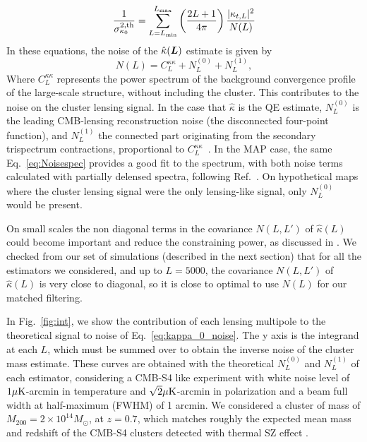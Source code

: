 \documentclass[prd, superscriptaddress, tightenlines, longbibliography, nofootinbib, eqsecnum, amsfonts, amsmath, floatfix, twocolumn, notitlepage]{revtex4-2}
\begin{document}
\begin{equation}
\frac{1}{\sigma^{2,\text{th}}_{\kappa_0}}=	\sum_{L=L_{\rm min}}^{L_{\rm max}} \left( \frac{2L + 1}{4\pi} \right)\frac{|\kappa_{t,L}|^2}{N(L)}
\end{equation}
In these equations, the noise of the $\hat \kappa(\vL)$ estimate is given by \begin{equation}\label{eq:Noisespec}
 	N(L) = C_L^{\kappa\kappa} + N_L^{(0)} + N_L^{(1)},
 \end{equation}
Where $C_L^{\kappa\kappa}$ represents the power spectrum of the background convergence profile of the large-scale structure, without including the cluster. This contributes to the noise on the cluster lensing signal. In the case that $\hat \kappa$ is the QE estimate, $N^{(0)}_L$ is the leading CMB-lensing reconstruction noise (the disconnected four-point function), and $N^{(1)}_L$ the connected part originating from the secondary trispectrum contractions, proportional to $C_L^{\kappa\kappa}$~\cite{Kesden:2003cc,Lewis:2006fu}. In the MAP case, the same Eq.~\eqref{eq:Noisespec} provides a good fit to the spectrum, with both noise terms calculated with partially delensed spectra, following Ref.~\cite{Legrand:2021qdu}. On hypothetical maps where the cluster lensing signal were the only lensing-like signal, only $N^{(0)}_L$ would be present.

On small scales the non diagonal terms in the covariance  $N(L, L')$ of $\hat \kappa(L)$ could become important and reduce the constraining power, as discussed in \cite{Horowitz:2017iql}.
 We checked from our set of simulations (described in the next section) that for all the estimators we considered, and up to $L=5000$, the covariance $N(L, L')$ of $\hat \kappa(L)$ is very close to diagonal, so it is close to optimal to use $N(L)$ for our matched filtering.

In Fig.~\ref{fig:int}, we show the contribution of each lensing multipole to the theoretical signal to noise of Eq.~\ref{eq:kappa_0_noise}. The y axis is the integrand at each $L$, which must be summed over to obtain the inverse noise of the cluster mass estimate. These curves are obtained with the theoretical $N_L^{(0)}$ and $N_L^{(1)}$ of each estimator, considering a  CMB-S4 like experiment with white noise level of $1 \mu \rm{K}$-arcmin in temperature and $\sqrt{2} \mu \rm{K}$-arcmin in polarization and a beam full width at half-maximum (FWHM) of 1 arcmin.
We considered a cluster of mass of $M_{200} = 2\times 10^{14}M_{\odot}$, at $z=0.7$, which matches roughly the expected mean mass and redshift of the CMB-S4 clusters detected with thermal SZ effect \cite{CMB-S4:2016ple}. 
\end{document}
